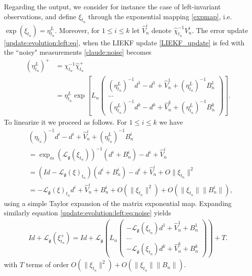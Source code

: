 \documentclass[a4paper,12pt,onecolumn]{article}
\newcommand{\norm}[1]{\lVert#1\rVert}
\begin{document}
Regarding the output,  we consider for instance the case of left-invariant observations, and define 
$\xi_{t_n}$ through the exponential mapping \eqref{expmap}, i.e. $\exp(\xi_{t_n})=\eta_{t_n}^L$. Moreover, for $1\leq i\leq k$ let $\hat{V}_n^i$ denote  $\hat\chi_{t_n}^{-1}V_n^i$. 
The error update  \eqref{update:evolution:left:eq}, when the LIEKF update \eqref{LIEKF_update} is fed with the ``noisy" measurements  \eqref{claude:noise} becomes
\begin{align}
\left( \eta_{t_n}^L \right)^+ & = \chi_{t_n}^{-1} \hat{\chi}_{t_n}^+ \nonumber \\
 & = \eta_{t_n}^L \exp \left[ L_n
\begin{pmatrix}
\left(\eta_{t_n}^L \right)^{-1} d^1 -  d^1 +  \hat V_n^1 + \left(\eta_{t_n}^L \right)^{-1} B_n^1 \\
... \\
\left(\eta_{t_n}^L \right)^{-1} d^k -  d^k + \hat V_n^k + \left(\eta_{t_n}^L\right)^{-1} B_n^k
\end{pmatrix} \right]. \label{update:evolution:left:eq:noise}
\end{align}
To linearize it we proceed as follows. For $1\leq i\leq k$ we have
\begin{align*}
 & (\eta_{t_n})^{-1}d^i-d^i + \hat V_n^i + (\eta_{t_n}^L)^{-1} B_n^i \\
 & =\exp_m( \mathcal{L}_{\mathfrak{g}}(\xi_{t_n}))^{-1} \left( d^i+ B_n^i   \right) -d^i + \hat{V}_n^i \\
 & = \left( Id-\mathcal{L}_{\mathfrak{g}} \left( \xi \right)_{t_n} \right) \left( d^i + B_n^i \right) - d^i + \hat{V}_n^i +O\norm{{\xi}_{t_n}}^2 \\&=-\mathcal{L}_{\mathfrak{g}}(\xi)_{t_n}d^i + \hat{V}_n^i +B_n^i +O \left( \norm{{\xi}_{t_n}}^2 \right)  +O \left( \norm{{\xi}_{t_n}} \norm{{B}_{n}^i} \right),
\end{align*}
using a simple Taylor expansion of the matrix exponential map. Expanding similarly equation \eqref{update:evolution:left:eq:noise} yields 
\begin{align}
Id+\mathcal{L}_{\mathfrak{g}}(\xi_{t_n}^+) = Id+ \mathcal{L}_{\mathfrak{g}} \left( L_n
 \begin{pmatrix}
-\mathcal{L}_{\mathfrak{g}}(\xi_{t_n}) d^1 + \hat{V}_n^1 +B_n^1 \\
... \\
-\mathcal{L}_{\mathfrak{g}}(\xi_{t_n}) d^k + \hat{V}_n^k +B_n^k
\end{pmatrix} \right) + T. \label{eeeq:eq}
\end{align}with $T$ terms of order $O \left(\norm{\xi_{t_n}}^2 \right) +O \left( \norm{{\xi}_{t_n}} \norm{{B}_{n}} \right)$. 
\end{document}
